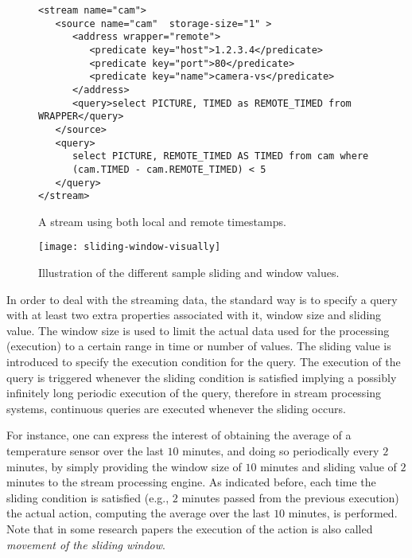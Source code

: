 \begin{figure}%
  \centering
  \lstset{numbers=left, numberstyle=\footnotesize}
\begin{lstlisting}
<stream name="cam">
   <source name="cam"  storage-size="1" >
      <address wrapper="remote">
         <predicate key="host">1.2.3.4</predicate>
         <predicate key="port">80</predicate>
         <predicate key="name">camera-vs</predicate>
      </address>
      <query>select PICTURE, TIMED as REMOTE_TIMED from WRAPPER</query>
   </source>
   <query>
      select PICTURE, REMOTE_TIMED AS TIMED from cam where 
      (cam.TIMED - cam.REMOTE_TIMED) < 5
   </query>
</stream>
\end{lstlisting}
   \caption{A stream using both local and remote timestamps.}
  \label{vs:complex-time}
\end{figure}

\begin{figure}
  \centering
  \texttt{[image: sliding-window-visually]}
  \caption{Illustration of the different sample sliding and window values.}
  \label{fig:sliding-window-visually}
\end{figure}

In order to deal with the streaming data, the standard way is to specify
a query with at least two extra properties associated with it,
window size and sliding value. The window size is used to limit
the actual data used for the processing (execution)  to a certain range
in time or number of values. The sliding value is introduced to
specify the execution condition for the query. The execution of the
query is triggered whenever the sliding condition is satisfied implying a possibly infinitely long periodic
execution of the query, therefore in stream processing systems, continuous queries are executed whenever the sliding occurs.

For instance, one can express the interest
of obtaining the average of a temperature sensor over the last $10$
minutes, and doing so periodically every $2$ minutes, by simply
providing the window size of $10$ minutes and sliding value of $2$
minutes to the stream processing engine. As indicated before, each
time the sliding condition is satisfied (e.g., $2$ minutes passed from
the previous execution) the actual action, computing the average over the last $10$
minutes, is performed. Note that in some research papers the
execution of the action is also called \emph{movement of the sliding
window}. 


